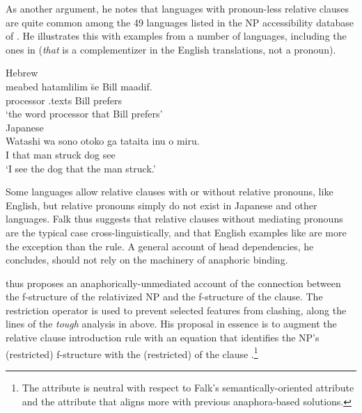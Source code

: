 \documentclass[output=paper,hidelinks]{langscibook}
\begin{document}
\noindent As another argument, he notes \citep[citing][]{DMaxwell1979} that languages with pronoun-less relative clauses are quite common among the 49 languages listed in the NP accessibility database of 
{\citet{KeenanComrey1979}}. He illustrates this with examples from a number of languages, including the ones in  (\textit{that} is a complementizer in the English translations, not a pronoun).

\ea\label{Hebrew}
\ea Hebrew\hsp{2em}\citep[from][]{falk2010}\\
\gll meabed hatamlilim \u{s}e Bill maadif.\\
processor \DEF.texts {\COMP} Bill prefers\\
\glt `the word processor that Bill prefers'\\[1ex]

\ex Japanese\hsp{2em}  \citep[from][]{KeenanComrey1979}\\ 
\gll Watashi wa sono otoko ga tataita inu o miru.\\
     I {\TOP} that man {\NOM} struck dog {\ACC} see\\
\glt `I see the dog that the man struck.'
 \z\z

\noindent Some languages allow relative clauses with or without relative pronouns, like English, but relative pronouns simply do not exist in Japanese and other languages.  Falk thus suggests that relative clauses without mediating pronouns are the typical case cross-linguistically, and that English examples like  are more the exception than the rule. A general account of head dependencies, he concludes, should not rely on the machinery of anaphoric binding.

\citet{falk2010} thus proposes an anaphorically-unmediated account of the connection between the f-structure of the relativized NP and the  f-structure of the clause.  The restriction operator is used to prevent selected features from clashing, along the lines of the \textit{tough} analysis in  above.  His proposal in essence is to augment the relative clause introduction rule  with an equation that identifies the NP's (restricted) f-structure with the (restricted)  of the clause .\footnote{The attribute  is neutral with respect to Falk's semantically-oriented  attribute and the attribute  that aligns more with previous anaphora-based solutions.}

\ea \label{relrestrictN}
\z 
\end{document}
